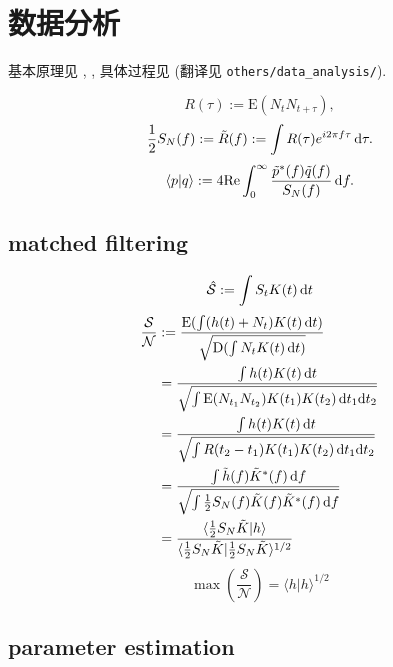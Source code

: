 \chapter{数据分析}

基本原理见 \cite{Finn1992}, \cite{Maggiore2014}, 具体过程见 \cite{Abbott2020} (翻译见 \texttt{others/data\_{}analysis/}).

\def\la{\langle}
\def\ra{\rangle}
\begin{equation}
    R(\tau):=\text{E}(N_tN_{t+\tau}),
\end{equation}
\begin{equation}
    \frac{1}{2}S_{N}(f):=\tilde{R}(f):=\int R(\tau)e^{i2\pi f\tau}\,\mathrm{d}\tau.
\end{equation}
\begin{equation}
    \la p|q \ra:=4\text{Re}\int_0^\infty\frac{\tilde{p}^*(f)\tilde{q}(f)}{S_{N}(f)}\,\d f.
\end{equation}

\section{matched filtering}

\begin{equation}
    \hat{\mathcal{S}}:=\int S_tK(t)\,\mathrm{d} t
\end{equation}
\begin{align}
    \frac{\mathcal{S}}{\mathcal{N}}&:=\frac{\text{E}(\int (h(t)+N_t)K(t)\,\d t)}{\sqrt{\text{D}(\int N_tK(t)\,\d t)}}\\
    &=\frac{\int h(t)K(t)\,\d t}{\sqrt{\int \text{E}(N_{t_1}N_{t_2})K(t_1)K(t_2)\,\d t_1\d t_2}}\\
    &=\frac{\int h(t)K(t)\,\d t}{\sqrt{\int R(t_2-t_1)K(t_1)K(t_2)\,\d t_1\d t_2}}\\
    &=\frac{\int \ti{h}(f)\ti{K}^*(f)\,\d f}{\sqrt{\int\frac{1}{2}S_{N}(f)\ti{K}(f)\ti{K}^*(f)\,\d f}}\\
    &=\frac{\la \frac{1}{2}S_{N}\ti{K}|h \ra}{\la \frac{1}{2}S_{N}\ti{K}|\frac{1}{2}S_{N}\ti{K} \ra^{1/2}}
\end{align}
\begin{equation}
    \max{(\frac{\mathcal{S}}{\mathcal{N}})}=\la h|h \ra^{1/2}
\end{equation}

\section{parameter estimation}

